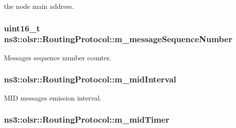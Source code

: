 the node main address. 

\subsubsection[{\texorpdfstring{m\+\_\+message\+Sequence\+Number}{m_messageSequenceNumber}}]{\setlength{\rightskip}{0pt plus 5cm}uint16\+\_\+t ns3\+::olsr\+::\+Routing\+Protocol\+::m\+\_\+message\+Sequence\+Number\hspace{0.3cm}{\ttfamily [private]}}\hypertarget{classns3_1_1olsr_1_1RoutingProtocol_a0f6d3f3ae8a78fbf2e2522d9f21e23ca}{}\label{classns3_1_1olsr_1_1RoutingProtocol_a0f6d3f3ae8a78fbf2e2522d9f21e23ca}


Messages sequence number counter. 

\subsubsection[{\texorpdfstring{m\+\_\+mid\+Interval}{m_midInterval}}]{ ns3\+::olsr\+::\+Routing\+Protocol\+::m\+\_\+mid\+Interval\hspace{0.3cm}{\ttfamily [private]}}\hypertarget{classns3_1_1olsr_1_1RoutingProtocol_a9109a692ebfe241e01a68a584a4961b9}{}\label{classns3_1_1olsr_1_1RoutingProtocol_a9109a692ebfe241e01a68a584a4961b9}


M\+ID messages\textquotesingle{} emission interval. 

\subsubsection[{\texorpdfstring{m\+\_\+mid\+Timer}{m_midTimer}}]{ ns3\+::olsr\+::\+Routing\+Protocol\+::m\+\_\+mid\+Timer\hspace{0.3cm}{\ttfamily [private]}}\hypertarget{classns3_1_1olsr_1_1RoutingProtocol_a7d525e1847150003ef21cd962a66c759}{}\label{classns3_1_1olsr_1_1RoutingProtocol_a7d525e1847150003ef21cd962a66c759}


